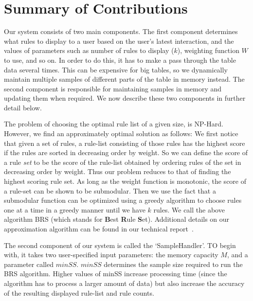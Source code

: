 
\section{Summary of Contributions}\label{sec:summary}

Our system consists of two main components. The first component determines what rules to display to a user based on the user's latest interaction, and the values of parameters such as number of rules to display ($k$), weighting function $W$ to use, and so on. In order to do this, it has to make a pass through the table data several times. This can be expensive for big tables, so we dynamically maintain multiple samples of different parts of the table in memory instead. The second component is responsible for maintaining samples in memory and updating them when required. We now describe these two components in further detail below.

The problem of choosing the optimal rule list of a given size, is NP-Hard. However, we find an approximately optimal solution as follows: We first notice that given a set of rules, a rule-list consisting of those rules has the highest score if the rules are sorted in decreasing order by weight. So we can define the score of a rule {\em set} to be the score of the rule-list obtained by ordering rules of the set in decreasing order by weight. Thus our problem reduces to that of finding the highest scoring rule set. As long as the weight function is monotonic, the score of a rule-set can be shown to be submodular. Then we use the fact that a submodular function can be optimized using a greedy algorithm to choose rules one at a time in a greedy manner until we have $k$ rules. We call the above algorithm BRS (which stands for {\bf B}est {\bf R}ule {\bf S}et). Additional details on our approximation algorithm can be found in our technical report~\cite{tr}. 

The second component of our system is called the `SampleHandler'. TO begin with, it takes two user-specified input parameters: the memory capacity $M$, and a parameter called $minSS$. $minSS$ determines the sample size required to run the BRS algorithm. Higher values of minSS increase processing time (since the algorithm has to process a larger amount of data) but also increase the accuracy of the resulting displayed rule-list and rule counts. 


